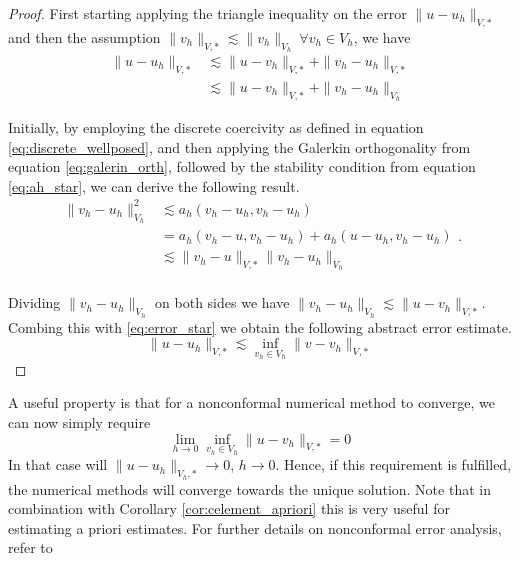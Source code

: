 \documentclass[11pt]{article}
\theoremstyle{remark}
\numberwithin{equation}{section}
\begin{document}
\begin{proof}
    First starting  applying the triangle inequality on the error $\| u - u_{h} \|_{V,*  }^{  } $ and then the assumption $\| v_{h} \|_{ V,* }^{  } \lesssim  \| v_{h} \|_{V_{h}  }^{  } \ \forall  v_{h} \in V_{h}  $, we have
    \begin{equation}
        \label{eq:error_star}
        \begin{split}
        \| u - u_{h} \|_{V,*  }^{  } & \lesssim \| u - v_{h} \|_{V,*  }^{  } + \| v_{h} - u_{h} \|_{V,*  }^{  } \\
                                     & \lesssim \| u - v_{h} \|_{V,*  }^{  } + \| v_{h} - u_{h} \|_{V_{h}  }^{  }
        \end{split}
    \end{equation}

Initially, by employing the discrete coercivity as defined in equation \eqref{eq:discrete_wellposed}, and then applying the Galerkin orthogonality from equation \eqref{eq:galerin_orth}, followed by the stability condition from equation \eqref{eq:ah_star}, we can derive the following result.
    \begin{equation}
        \label{eq:cealemma_proof}
        \begin{split}
            \| v_{h} -u_{h} \|_{ V_{h}  }^{ 2 } & \lesssim   a_{h}( v_{h} - u_{h}, v_{h} - u_{h} )    \\
                                                &= a_{h}( v_{h} - u, v_{h}- u_{h}) + a_{h}( u - u_{h}, v_{h} - u_{h})   \\
                                                & \lesssim \| v_{h}- u \|_{ V,* }^{  } \| v_{h}- u_{h} \|_{V_{h} }^{  }   \\
        \end{split}
    .\end{equation}

    Dividing $\| v_{h}- u_{h} \|_{V_{h} }^{  }$ on both sides we have $ \| v_{h}- u_{h} \|_{V_{h} }^{  } \lesssim \|  u -  v_{h}\|_{ V,* }^{  } $. Combing this with \eqref{eq:error_star} we obtain the following abstract error estimate.
    \begin{equation}
        \| u - u_{h} \|_{ V,*  }^{  }  \lesssim  \inf_{v_{h} \in  V_{h}}  \| v - v_{h} \|_{ V_{},*  }^{  }
    \end{equation}
\end{proof}

A useful property is that for a nonconformal numerical method to converge, we can now simply require
\begin{equation}
\lim_{h \to 0}  \inf_{v_{h} \in  V_{h}}  \| u - v_{h} \|_{ V,*  }^{  } = 0
\end{equation}
In that case will $\| u - u_{h} \|_{ V_{h},*  }^{  }  \to  0$, $h \to  0$. Hence, if this requirement is fulfilled, the numerical methods will converge towards the unique solution.
Note that in combination with Corollary \ref{cor:celement_apriori} this is very useful for estimating a priori estimates. For further details on nonconformal error analysis, refer to \cite[Chapter 1.3]{pietro2012}
\end{document}
